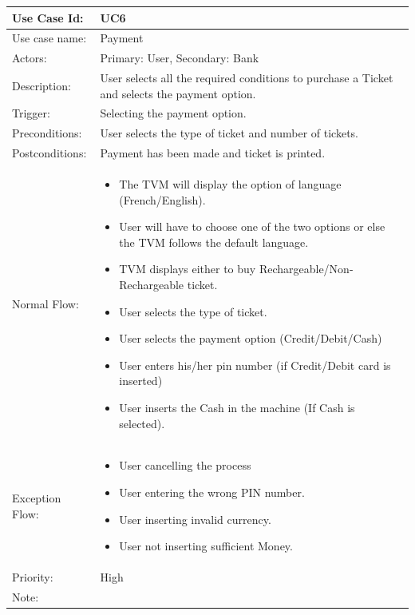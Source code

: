 \documentclass[11pt,oneside]{book}
\begin{document}
\begin{table}[h]
\centering
\begin{tabular}{|p{2.4cm}|p{11cm}|}
\hline
{Use Case Id: } & {UC6} \\
\hline
{Use case name:} & { Payment}\\
\hline
{Actors: } & {Primary: User, Secondary: Bank}\\
\hline
{Description:} & {User selects all the required conditions to purchase a Ticket and selects the payment option. }\\
\hline
 
{Trigger:  } & {Selecting the payment option.}\\
\hline
{Preconditions:  } & {User selects the type of ticket and number of tickets.}\\
\hline
{Postconditions:} & {Payment has been made and ticket is printed.}\\
\hline
{Normal Flow: } & {
\begin{itemize}

\item		The TVM will display the option of language (French/English).
\item	User will have to choose one of the two options or else the TVM follows the default language.
\item	TVM displays either to buy Rechargeable/Non-Rechargeable ticket.
\item	User selects the type of ticket.
\item	User selects the payment option (Credit/Debit/Cash)
\item	User enters his/her pin number (if Credit/Debit card is inserted)
\item	User inserts the Cash in the machine (If Cash is selected).




 
\end{itemize}
}\\
\hline
{Exception Flow: } & {
\begin{itemize}

\item		User cancelling the process
\item	User entering the wrong PIN number.
\item	User inserting invalid currency.
\item	User not inserting sufficient Money.

\end{itemize}
}\\
\hline
{Priority:  } & {High}\\
\hline
{Note:  } & {
\begin{itemize}


\end{itemize}}
\end{tabular}
\end{table}
\end{document}
